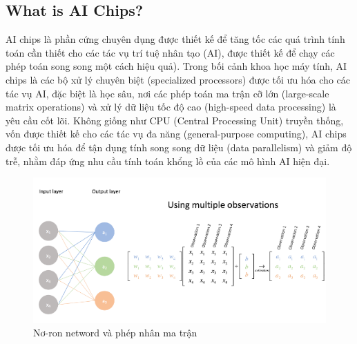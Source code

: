 \documentclass[a4paper]{article}
\begin{document}
\subsection{What is AI Chips?}
AI chips là phần cứng chuyên dụng được thiết kế để tăng tốc các quá trình tính toán cần thiết cho các tác vụ trí tuệ nhân tạo (AI), được thiết kế để chạy các phép toán song song một cách hiệu quả). Trong bối cảnh khoa học máy tính, AI chips là các bộ xử lý chuyên biệt (specialized processors) được tối ưu hóa cho các tác vụ AI, đặc biệt là học sâu, nơi các phép toán ma trận cỡ lớn (large-scale matrix operations) và xử lý dữ liệu tốc độ cao (high-speed data processing) là yêu cầu cốt lõi. Không giống như CPU (Central Processing Unit) truyền thống, vốn được thiết kế cho các tác vụ đa năng (general-purpose computing), AI chips được tối ưu hóa để tận dụng tính song song dữ liệu (data parallelism) và giảm độ trễ, nhằm đáp ứng nhu cầu tính toán khổng lồ của các mô hình AI hiện đại.
\begin{figure}[H]
    \centering
    \includegraphics[width=1\linewidth]{assets/dl-mt.png}
    \caption{Nơ-ron netword và phép nhân ma trận}
    \label{fig:enter-label}
\end{figure}
\end{document}
